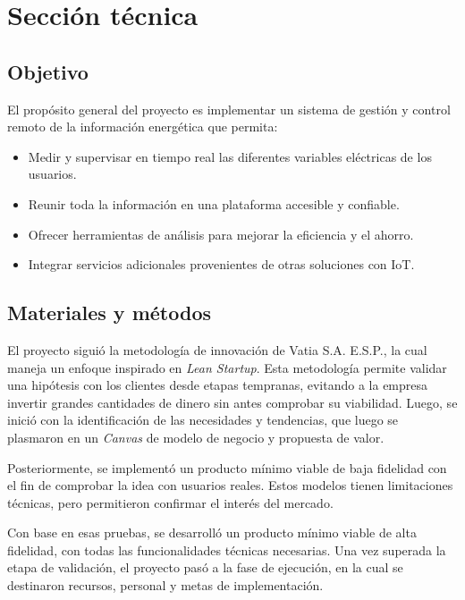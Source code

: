 \section{Sección técnica}

\subsection{Objetivo}
El propósito general del proyecto es implementar un sistema de gestión y control remoto de la información energética que permita:
\begin{itemize}
    \item Medir y supervisar en tiempo real las diferentes variables eléctricas de los usuarios.
    \item Reunir toda la información en una plataforma accesible y confiable.
    \item Ofrecer herramientas de análisis para mejorar la eficiencia y el ahorro.
    \item Integrar servicios adicionales provenientes de otras soluciones con IoT.
\end{itemize}

\subsection{Materiales y métodos}
El proyecto siguió la metodología de innovación de Vatia S.A. E.S.P., la cual maneja un enfoque inspirado en \textit{Lean Startup}. Esta metodología permite validar una hipótesis con los clientes desde etapas tempranas, evitando a la empresa invertir grandes cantidades de dinero sin antes comprobar su viabilidad. Luego, se inició con la identificación de las necesidades y tendencias, que luego se plasmaron en un \textit{Canvas} de modelo de negocio y propuesta de valor.

Posteriormente, se implementó un producto mínimo viable de baja fidelidad con el fin de comprobar la idea con usuarios reales. Estos modelos tienen limitaciones técnicas, pero permitieron confirmar el interés del mercado.

Con base en esas pruebas, se desarrolló un producto mínimo viable de alta fidelidad, con todas las funcionalidades técnicas necesarias. Una vez superada la etapa de validación, el proyecto pasó a la fase de ejecución, en la cual se destinaron recursos, personal y metas de implementación.

